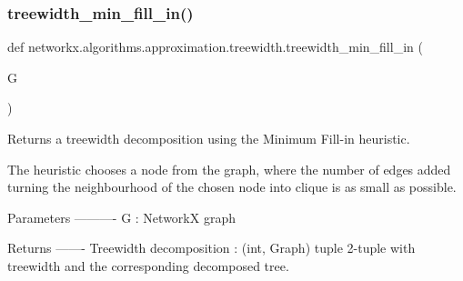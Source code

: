 \subsubsection{\texorpdfstring{treewidth\+\_\+min\+\_\+fill\+\_\+in()}{treewidth\_min\_fill\_in()}}
{\footnotesize\ttfamily def networkx.\+algorithms.\+approximation.\+treewidth.\+treewidth\+\_\+min\+\_\+fill\+\_\+in (\begin{DoxyParamCaption}\item[{}]{G }\end{DoxyParamCaption})}

\begin{DoxyVerb}Returns a treewidth decomposition using the Minimum Fill-in heuristic.

The heuristic chooses a node from the graph, where the number of edges
added turning the neighbourhood of the chosen node into clique is as
small as possible.

Parameters
----------
G : NetworkX graph

Returns
-------
Treewidth decomposition : (int, Graph) tuple
    2-tuple with treewidth and the corresponding decomposed tree.
\end{DoxyVerb}
 